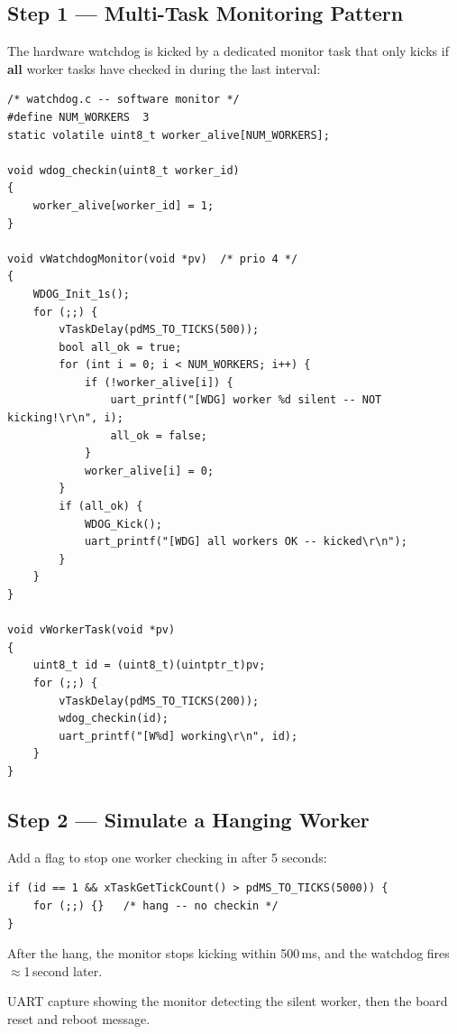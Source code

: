 \documentclass[11pt, a4paper]{article}
\begin{document}
\subsection{Step 1 --- Multi-Task Monitoring Pattern}

The hardware watchdog is kicked by a dedicated monitor task that only kicks if
\textbf{all} worker tasks have checked in during the last interval:

\begin{lstlisting}[style=cstyle]
/* watchdog.c -- software monitor */
#define NUM_WORKERS  3
static volatile uint8_t worker_alive[NUM_WORKERS];

void wdog_checkin(uint8_t worker_id)
{
    worker_alive[worker_id] = 1;
}

void vWatchdogMonitor(void *pv)  /* prio 4 */
{
    WDOG_Init_1s();
    for (;;) {
        vTaskDelay(pdMS_TO_TICKS(500));
        bool all_ok = true;
        for (int i = 0; i < NUM_WORKERS; i++) {
            if (!worker_alive[i]) {
                uart_printf("[WDG] worker %d silent -- NOT kicking!\r\n", i);
                all_ok = false;
            }
            worker_alive[i] = 0;
        }
        if (all_ok) {
            WDOG_Kick();
            uart_printf("[WDG] all workers OK -- kicked\r\n");
        }
    }
}

void vWorkerTask(void *pv)
{
    uint8_t id = (uint8_t)(uintptr_t)pv;
    for (;;) {
        vTaskDelay(pdMS_TO_TICKS(200));
        wdog_checkin(id);
        uart_printf("[W%d] working\r\n", id);
    }
}
\end{lstlisting}

\subsection{Step 2 --- Simulate a Hanging Worker}

Add a flag to stop one worker checking in after 5 seconds:

\begin{lstlisting}[style=cstyle]
if (id == 1 && xTaskGetTickCount() > pdMS_TO_TICKS(5000)) {
    for (;;) {}   /* hang -- no checkin */
}
\end{lstlisting}

After the hang, the monitor stops kicking within 500\,ms, and the watchdog fires
$\approx$1\,second later.

\begin{checkpointbox}[~D]
  UART capture showing the monitor detecting the silent worker, then the board reset
  and reboot message.
\end{checkpointbox}
\end{document}
